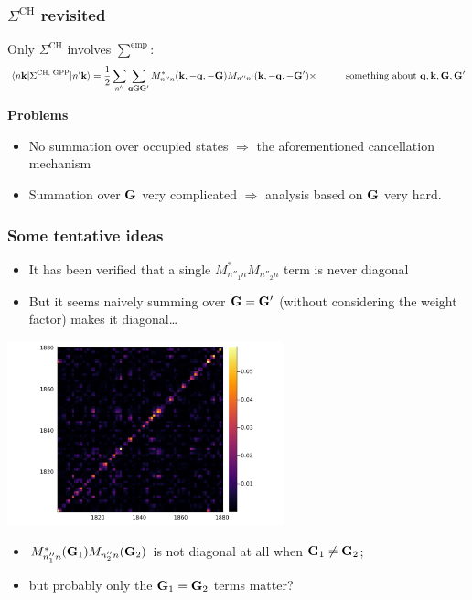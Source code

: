 \documentclass[t]{beamer}
\newcommand{\xmark}{\ding{55}}%
\def\\{}%
\begin{document}
\begin{frame}
\frametitle{$\Sigma^{\text{CH}}$ revisited}

Only $\Sigma^{\text{CH}}$ involves $\sum^{\text{emp}}$:
\begin{equation*}
    \begin{aligned}
        \mel*{n \vb{k}}{\Sigma^{\text{CH, GPP}}}{n' \vb{k}} 
        &= \frac{1}{2} \sum_{n''} \sum_{\vb{q} \vb{G} \vb{G}'} M_{n'' n}^*(\vb{k}, - \vb{q}, -\vb{G})
        M_{n'' n'}(\vb{k}, - \vb{q}, - \vb{G}') \times  \\
        &\quad \quad \text{something about $\vb{q}, \vb{k}, \vb{G}, \vb{G}'$}
    \end{aligned}
    \label{eq:ch.simple}
\end{equation*}

\textbf{Problems} \begin{itemize}
    \item No summation over occupied states $\Rightarrow$ 
    \xmark the aforementioned cancellation mechanism 
    \item Summation over $\vb{G}$ very complicated $\Rightarrow$
    analysis based on $\vb{G}$ very hard.
\end{itemize}

\end{frame}

\begin{frame}[allowframebreaks]
\frametitle{Some tentative ideas}

\begin{itemize}
    \item It has been verified that a single $M_{n''_1 n}^* M_{n''_2 n}$ term is never diagonal
    \item But it seems naively summing over $\vb{G} = \vb{G}'$ (without considering the weight factor)
    makes it diagonal\dots
\end{itemize}    

\begin{center}
    \includegraphics[width=0.6\textwidth]{../data/sigma/nc_range-1800-1880-n_idx-119-n_prime_idx_119-k_idx-1-q_idx-1-G_range-800-900.png}
\end{center}

\begin{itemize}
    \item $M_{n''_1 n}^*(\vb{G}_1) M_{n''_2 n}(\vb{G}_2)$ is not diagonal at all when $\vb{G}_1 \neq \vb{G}_2$; 
    \item but probably only the $\vb{G}_1 = \vb{G}_2$ terms matter?
\end{itemize}

\end{frame}
\end{document}
